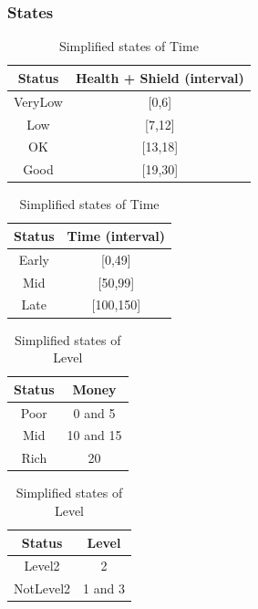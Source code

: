 \documentclass{article}
\begin{document}
  \subsubsection{States}
  \begin{table}[h!]
      \parbox{.45\linewidth}{
        \centering
        \caption{Simplified states of Health}
        \label{tab:healthStates}
        \begin{tabular}{c|c}
          \textbf{Status} & \textbf{Health + Shield (interval)}\\
          \hline
          VeryLow & [0,6]\\
          Low & [7,12]\\
          OK & [13,18]\\
          Good & [19,30]\\
        \end{tabular}
      }
      \hfil
      \parbox{.45\linewidth}{
        \centering
        \caption{Simplified states of Time}
        \label{tab:timeStates}
        \begin{tabular}{c|c}
          \textbf{Status} & \textbf{Time (interval)}\\
          \hline
          Early  & [0,49]\\
          Mid & [50,99]\\
          Late & [100,150]\\
        \end{tabular}
      }
  \end{table}
  \begin{table}[h!]
    \parbox{.45\linewidth}{
      \centering
      \caption{Simplified states of Money}
      \label{tab:moneyStates}
      \begin{tabular}{c|c}
        \textbf{Status} & \textbf{Money}\\
        \hline
        Poor & 0 and 5\\
        Mid & 10 and 15\\
        Rich & 20\\
      \end{tabular}
    }
    \hfil
    \parbox{.45\linewidth}{
      \centering
      \caption{Simplified states of Level}
      \label{tab:levelStates}
      \begin{tabular}{c|c}
        \textbf{Status} & \textbf{Level}\\
        \hline
        Level2 & 2\\
        NotLevel2 & 1 and 3\\
      \end{tabular}
    }
  \end{table}
\end{document}
